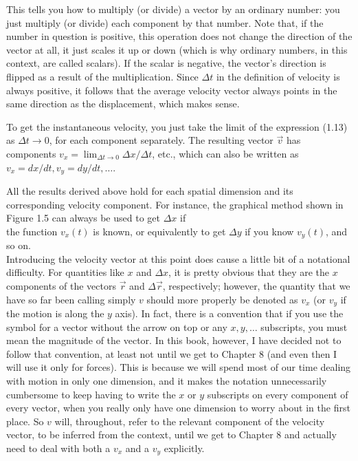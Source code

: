 \documentclass[10pt]{article}
\begin{document}
This tells you how to multiply (or divide) a vector by an ordinary number: you just multiply (or divide) each component by that number. Note that, if the number in question is positive, this operation does not change the direction of the vector at all, it just scales it up or down (which is why ordinary numbers, in this context, are called scalars). If the scalar is negative, the vector's direction is flipped as a result of the multiplication. Since $\Delta t$ in the definition of velocity is always positive, it follows that the average velocity vector always points in the same direction as the displacement, which makes sense.

To get the instantaneous velocity, you just take the limit of the expression (1.13) as $\Delta t \rightarrow 0$, for each component separately. The resulting vector $\vec{v}$ has components $v_{x}=\lim _{\Delta t \rightarrow 0} \Delta x / \Delta t$, etc., which can also be written as $v_{x}=d x / d t, v_{y}=d y / d t, \ldots$.

All the results derived above hold for each spatial dimension and its corresponding velocity component. For instance, the graphical method shown in Figure 1.5 can always be used to get $\Delta x$ if\\
the function $v_{x}(t)$ is known, or equivalently to get $\Delta y$ if you know $v_{y}(t)$, and so on.\\
Introducing the velocity vector at this point does cause a little bit of a notational difficulty. For quantities like $x$ and $\Delta x$, it is pretty obvious that they are the $x$ components of the vectors $\vec{r}$ and $\Delta \vec{r}$, respectively; however, the quantity that we have so far been calling simply $v$ should more properly be denoted as $v_{x}$ (or $v_{y}$ if the motion is along the $y$ axis). In fact, there is a convention that if you use the symbol for a vector without the arrow on top or any $x, y, \ldots$ subscripts, you must mean the magnitude of the vector. In this book, however, I have decided not to follow that convention, at least not until we get to Chapter 8 (and even then I will use it only for forces). This is because we will spend most of our time dealing with motion in only one dimension, and it makes the notation unnecessarily cumbersome to keep having to write the $x$ or $y$ subscripts on every component of every vector, when you really only have one dimension to worry about in the first place. So $v$ will, throughout, refer to the relevant component of the velocity vector, to be inferred from the context, until we get to Chapter 8 and actually need to deal with both a $v_{x}$ and a $v_{y}$ explicitly.
\end{document}
